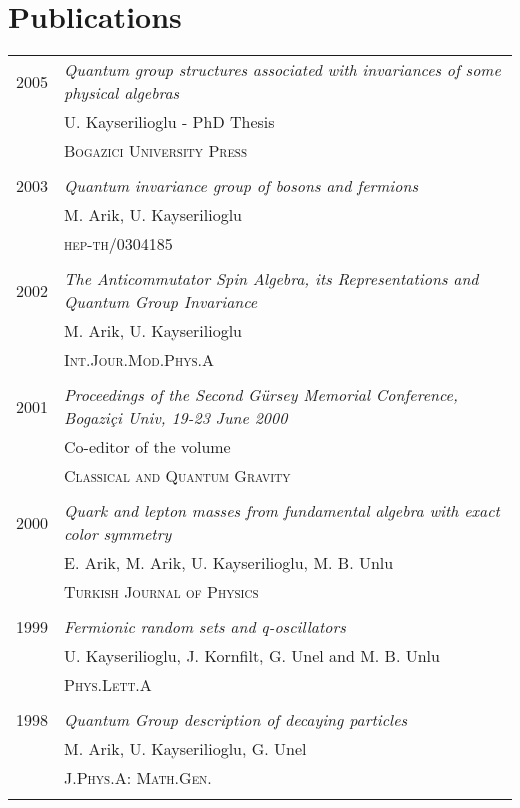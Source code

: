 \documentclass[a4paper,10pt]{article}
\begin{document}
\section{Publications}
\begin{longtable}{rl}
 \textsc{2005}  & \textit{Quantum group structures associated with invariances of some physical algebras} \\
                & U. Kayserilioglu - PhD Thesis \\
                & \textsc{Bogazici University Press} \\
                & \\

 \textsc{2003}  & \textit{Quantum invariance group of bosons and fermions} \\
                & M. Arik, U. Kayserilioglu \\
                & \textsc{hep-th/0304185} \\
                & \\

 \textsc{2002}  & \textit{The Anticommutator Spin Algebra, its Representations and Quantum Group Invariance} \\
                & M. Arik, U. Kayserilioglu \\
                & \textsc{Int.Jour.Mod.Phys.A} \\
                & \\

 \textsc{2001}  & \textit{Proceedings of the Second Gürsey Memorial Conference, Bogaziçi Univ, 19-23 June 2000} \\
                & Co-editor of the volume \\
                & \textsc{Classical and Quantum Gravity} \\
                & \\

 \textsc{2000}  & \textit{Quark and lepton masses from fundamental algebra with exact color symmetry} \\
                & E. Arik, M. Arik, U. Kayserilioglu, M. B. Unlu \\
                & \textsc{Turkish Journal of Physics} \\
                & \\

 \textsc{1999}  & \textit{Fermionic random sets and q-oscillators} \\
                & U. Kayserilioglu, J. Kornfilt, G. Unel and M. B. Unlu \\
                & \textsc{Phys.Lett.A} \\
                & \\

 \textsc{1998}  & \textit{Quantum Group description of decaying particles} \\
                & M. Arik, U. Kayserilioglu, G. Unel \\
                & \textsc{J.Phys.A: Math.Gen.} \\
                & \\
\end{longtable}
\end{document}

